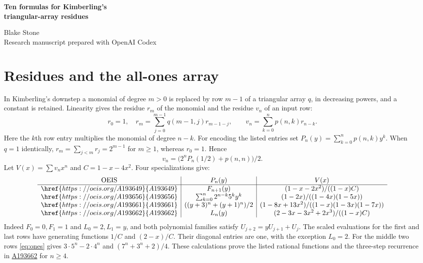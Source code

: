 \documentclass[11pt,letterpaper]{article}
\newcommand{\oeis}[1]{\href{https://oeis.org/A#1}{A#1}}
\begin{document}
\thispagestyle{plain}
\begin{center}
{\LARGE\bfseries Ten formulas for Kimberling's\\[0.12em] triangular-array residues\par}
\vspace{0.5em}
Blake Stone\\
{\small Research manuscript prepared with OpenAI Codex}
\end{center}

\begin{abstract}
We derive ten generating-function and recurrence predictions made by R. J. Mathar for Clark Kimberling's triangular-array residues. The all-ones array reduces a row to one polynomial evaluation and one endpoint. Two growing arrays give a common four-step recurrence for a full affine family. Several sequence titles use different arrays or coefficient orders from the published programs and data; we give the conventions explicitly.
\end{abstract}

\section{Residues and the all-ones array}
In Kimberling's downstep a monomial of degree $m>0$ is replaced by row $m-1$ of a triangular array $q$, in decreasing powers, and a constant is retained. Linearity gives the residue $r_m$ of the monomial and the residue $v_n$ of an input row:
\[
 r_0=1,\quad r_m=\sum_{j=0}^{m-1}q(m-1,j)r_{m-1-j},
 \qquad v_n=\sum_{k=0}^n p(n,k)r_{n-k}.
\]
Here the $k$th row entry multiplies the monomial of degree $n-k$. For encoding the listed entries set $P_n(y)=\sum_{k=0}^n p(n,k)y^k$. When $q=1$ identically, $r_m=\sum_{j<m}r_j=2^{m-1}$ for $m\ge1$, whereas $r_0=1$. Hence
\begin{equation}\label{eq:ones}
                v_n=\bigl(2^n P_n(1/2)+p(n,n)\bigr)/2 .
\end{equation}
Let $V(x)=\sum v_nx^n$ and $C=1-x-4x^2$. Four specializations give:
\[
\begin{array}{c|c|c}
 \text{OEIS}&P_n(y)&V(x)\\ \hline
 \oeis{193649}&F_{n+1}(y)&(1-x-2x^2)/((1-x)C)\\
 \oeis{193656}&\sum_{k=0}^n 2^{n-k}5^k y^k&(1-2x)/((1-4x)(1-5x))\\
 \oeis{193661}&((y+3)^n+(y+1)^n)/2&(1-8x+13x^2)/((1-x)(1-3x)(1-7x))\\
 \oeis{193662}&L_n(y)&(2-3x-3x^2+2x^3)/((1-x)C)
\end{array}
\]
Indeed $F_0=0,F_1=1$ and $L_0=2,L_1=y$, and both polynomial families satisfy $U_{j+2}=yU_{j+1}+U_j$. The scaled evaluations for the first and last rows have generating functions $1/C$ and $(2-x)/C$. Their diagonal entries are one, with the exception $L_0=2$. For the middle two rows \eqref{eq:ones} gives $3\cdot5^n-2\cdot4^n$ and $(7^n+3^n+2)/4$. These calculations prove the listed rational functions and the three-step recurrence in \oeis{193662} for $n\ge4$.
\end{document}
